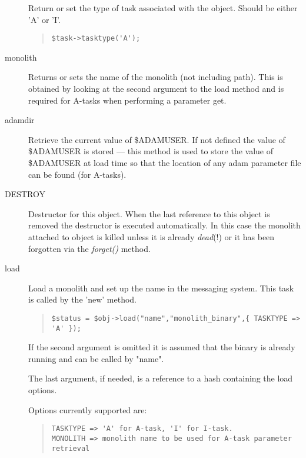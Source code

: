 \documentclass[twoside,11pt]{article}
\newenvironment{myquote}{\begin{quote}\begin{small}}{\end{small}\end{quote}}
\renewcommand{\_}{\texttt{\symbol{95}}}
\begin{document}
\begin{description}
Return or set the type of task associated with the object.
Should be either 'A' or 'I'.
\begin{myquote}
\begin{verbatim}
$task->tasktype('A');
\end{verbatim} 
\end{myquote}  %

\item[monolith] \mbox{}

Returns or sets the name of the monolith (not including path).
This is obtained by looking at the second argument to the
load method and is required for A-tasks when performing a parameter
get.

\item[adamdir] \mbox{}

Retrieve the current value of \$ADAM\_{}USER. If not defined the
value of \$ADAM\_{}USER is stored --- this method is used to store the
value of \$ADAM\_{}USER at load time so that the location of any
adam parameter file can be found (for A-tasks).

\item[DESTROY] \mbox{}

Destructor for this object. When the last reference to this
object is removed the destructor is executed automatically.
In this case the monolith attached to object is killed 
unless it is already {\em dead\/}(!) or it has been forgotten
via the {\em forget()\/} method.

\item[load] \mbox{}

Load a monolith and set up the name in the messaging system.
This task is called by the 'new' method.
\begin{myquote}
\begin{verbatim}
$status = $obj->load("name","monolith_binary",{ TASKTYPE => 'A' });
\end{verbatim}
\end{myquote}

If the second argument is omitted it is assumed that the binary
is already running and can be called by "name".   

The last argument, if needed, is a reference to a hash containing
the load options. 

Options currently supported are:
\begin{myquote}
\begin{verbatim}
TASKTYPE => 'A' for A-task, 'I' for I-task.
MONOLITH => monolith name to be used for A-task parameter retrieval
\end{verbatim}
\end{myquote}


\end{description}
\end{document}
